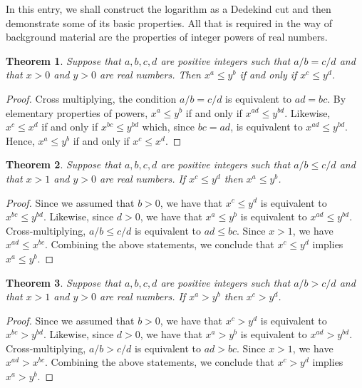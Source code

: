 \documentclass[12pt]{article}
\newtheorem{thm}{Theorem}
\begin{document}
In this entry, we shall construct the logarithm as a Dedekind cut
and then demonstrate some of its basic properties.  All that is
required in the way of background material are the properties of
integer powers of real numbers.

\begin{thm}
Suppose that $a,b,c,d$ are positive integers such that
$a/b = c/d$ and that $x>0$ and $y>0$ are  real numbers. 
Then $x^a \le y^b$ if and only if $x^c \le y^d$.
\end{thm}

\begin{proof}
Cross multiplying, the condition $a/b = c/d$ is equivalent to $ad = bc$.
By elementary properties of powers, $x^a \le y^b$ if and only if
$x^{ad} \le y^{bd}$.  Likewise, $x^c \le x^d$ if and only if $x^{bc} \le
y^{bd}$ which, since $bc = ad$, is equivalent to $x^{ad} \le y^{bd}$.
Hence, $x^a \le y^b$ if and only if $x^c \le x^d$.
\end{proof}

\begin{thm}
Suppose that $a,b,c,d$ are positive integers such that
$a/b \le c/d$ and that $x>1$ and $y>0$ are real numbers.  
If $x^c \le y^d$ then $x^a \le y^b$.
\end{thm}

\begin{proof}
Since we assumed that $b > 0$, we have that $x^c \le y^d$ is equivalent
to $x^{bc} \le y^{bd}$.  Likewise, since $d > 0$, we have that $x^a \le 
y^b$ is equivalent to $x^{ad} \le y^{bd}$.  Cross-multiplying, $a/b \le c/d$
is equivalent to $ad \le bc$.  Since $x > 1$, we have $x^{ad} \le x^{bc}$.
Combining the above statements, we conclude that $x^c \le y^d$ implies
$x^a \le y^b$.
\end{proof}

\begin{thm}
Suppose that $a,b,c,d$ are positive integers such that
$a/b > c/d$ and that $x>1$ and $y>0$ are real numbers.  
If $x^a > y^b$ then $x^c > y^d$.
\end{thm}

\begin{proof}
Since we assumed that $b > 0$, we have that $x^c > y^d$ is equivalent
to $x^{bc} > y^{bd}$.  Likewise, since $d > 0$, we have that $x^a > 
y^b$ is equivalent to $x^{ad} > y^{bd}$.  Cross-multiplying, $a/b > c/d$
is equivalent to $ad > bc$.  Since $x > 1$, we have $x^{ad} > x^{bc}$.
Combining the above statements, we conclude that $x^c > y^d$ implies
$x^a > y^b$.
\end{proof}
\end{document}
